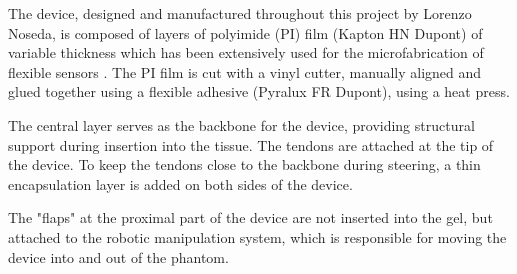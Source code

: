 The device, designed and manufactured throughout this project by Lorenzo Noseda, is composed of layers of polyimide (PI) film (Kapton HN Dupont) of variable thickness which has been extensively used for the microfabrication of flexible sensors \cite{noseda_flat_2024}. The PI film is cut with a vinyl cutter, manually aligned and glued together using a flexible adhesive (Pyralux FR Dupont), using a heat press. 

The central layer serves as the backbone for the device, providing structural support during insertion into the tissue. The tendons are attached at the tip of the device. To keep the tendons close to the backbone during steering, a thin encapsulation layer is added on both sides of the device. 

The "flaps" at the proximal part of the device are not inserted into the gel, but attached to the robotic manipulation system, which is responsible for moving the device into and out of the phantom.

